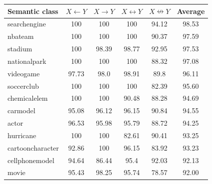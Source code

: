 \begin{table}[h]
  \tiny
  \begin{center}
    \begin{tabular}{l|c|c|c|c||c}
      \hline
      Semantic class    &  $X \leftarrow Y$  &  $X \rightarrow Y$  &  $X \leftrightarrow Y$  &  $X \nleftrightarrow Y$  &  Average  \\
      \hline
      searchengine      &               100  &                100  &                    100  &                   94.12  &    98.53  \\
      nbateam           &               100  &                100  &                    100  &                   90.37  &    97.59  \\
      stadium           &               100  &              98.39  &                  98.77  &                   92.95  &    97.53  \\
      nationalpark      &               100  &                100  &                    100  &                   88.32  &    97.08  \\
      videogame         &             97.73  &               98.0  &                  98.91  &                    89.8  &    96.11  \\
      soccerclub        &               100  &                100  &                    100  &                   82.39  &    95.60  \\
      chemicalelem      &               100  &                100  &                  90.48  &                   88.28  &    94.69  \\
      carmodel          &             95.08  &              96.12  &                  96.15  &                   90.84  &    94.55  \\
      actor             &             96.53  &              95.98  &                  95.79  &                   88.72  &    94.25  \\
      hurricane         &               100  &                100  &                  82.61  &                   90.41  &    93.25  \\
      cartooncharacter  &             92.86  &                100  &                  96.15  &                   83.92  &    93.23  \\
      cellphonemodel    &             94.64  &              86.44  &                   95.4  &                   92.03  &    92.13  \\
      movie             &             95.43  &              98.25  &                  95.74  &                   78.57  &    92.00  \\

\end{tabular}
\end{center}
\end{table}
